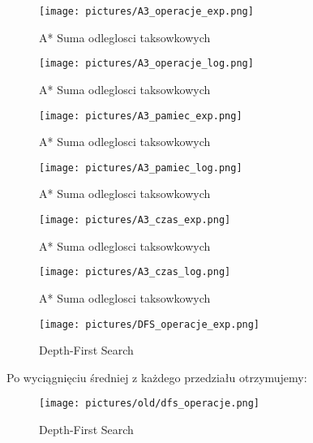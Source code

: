 \documentclass{classrep}
\begin{document}
\begin{figure}[ht]
\centering
			\texttt{[image: pictures/A3\_operacje\_exp.png]}
	\caption{A* Suma odleglosci taksowkowych}
	\label{fig:A* Suma odleglosci taksowkowych}
\end{figure}

\begin{figure}[ht]
\centering
			\texttt{[image: pictures/A3\_operacje\_log.png]}
	\caption{A* Suma odleglosci taksowkowych}
	\label{fig:A* Suma odleglosci taksowkowych}
\end{figure}

\begin{figure}[ht]
\centering
			\texttt{[image: pictures/A3\_pamiec\_exp.png]}
	\caption{A* Suma odleglosci taksowkowych}
	\label{fig:A* Suma odleglosci taksowkowych}
\end{figure}

\begin{figure}[ht]
\centering
			\texttt{[image: pictures/A3\_pamiec\_log.png]}
	\caption{A* Suma odleglosci taksowkowych}
	\label{fig:A* Suma odleglosci taksowkowych}
\end{figure}

\begin{figure}[ht]
\centering
			\texttt{[image: pictures/A3\_czas\_exp.png]}
	\caption{A* Suma odleglosci taksowkowych}
	\label{fig:A* Suma odleglosci taksowkowych}
\end{figure}

\begin{figure}[ht]
\centering
			\texttt{[image: pictures/A3\_czas\_log.png]}
	\caption{A* Suma odleglosci taksowkowych}
	\label{fig:A* Suma odleglosci taksowkowych}
\end{figure}

\clearpage

\begin{figure}[ht]
\centering
			\texttt{[image: pictures/DFS\_operacje\_exp.png]}
	\caption{Depth-First Search}
	\label{fig:Depth-First Search}
\end{figure}

Po wyciągnięciu średniej z każdego przedziału otrzymujemy:

\begin{figure}[ht]
\centering
			\texttt{[image: pictures/old/dfs\_operacje.png]}
	\caption{Depth-First Search}
	\label{fig:Depth-First Search}
\end{figure}
\end{document}
